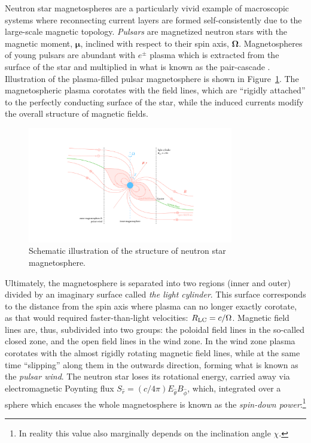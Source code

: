 Neutron star magnetospheres are a particularly vivid example of macroscopic systems where reconnecting current layers are formed self-consistently due to the large-scale magnetic topology. \emph{Pulsars} are magnetized neutron stars with the magnetic moment, $\bm{\mu}$, inclined with respect to their spin axis, $\bm{\Omega}$. Magnetospheres of young pulsars are abundant with $e^\pm$ plasma which is extracted from the surface of the star and multiplied in what is known as the pair-cascade  \citep{1969ApJ...157..869G, 1975ApJ...196...51R}. Illustration of the plasma-filled pulsar magnetosphere is shown in Figure~\ref{fig:intro-psr}. The magnetospheric plasma corotates with the field lines, which are ``rigidly attached'' to the perfectly conducting surface of the star, while the induced currents modify the overall structure of magnetic fields.

\begin{figure}[htb]
    \centering
    \includegraphics[width=0.8\textwidth,trim={350 150 350 150},clip]{figures/intro/pulsar_side.pdf}
    \caption{Schematic illustration of the structure of neutron star magnetosphere.}
    \label{fig:intro-psr}
\end{figure}

Ultimately, the magnetosphere is separated into two regions (inner and outer) divided by an imaginary surface called \emph{the light cylinder}. This surface corresponds to the distance from the spin axis where plasma can no longer exactly corotate, as that would required faster-than-light velocities: $R_{\rm LC} = c/\Omega$. Magnetic field lines are, thus, subdivided into two groups: the poloidal field lines in the so-called closed zone, and the open field lines in the wind zone. In the wind zone plasma corotates with the almost rigidly rotating magnetic field lines, while at the same time ``slipping'' along them in the outwards direction, forming what is known as the \emph{pulsar wind}. The neutron star loses its rotational energy, carried away via electromagnetic Poynting flux $S_{\hat{r}} = (c/4\pi) E_{\hat{\theta}}B_{\hat{\phi}}$, which, integrated over a sphere which encases the whole magnetosphere is known as the \emph{spin-down power}:\footnote{In reality this value also marginally depends on the inclination angle $\chi$.}


